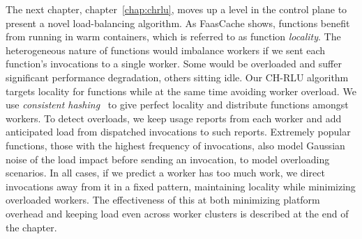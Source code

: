 The next chapter, chapter~\ref{chap:chrlu}, moves up a level in the control plane to present a novel load-balancing algorithm. %
As FaasCache shows, functions benefit from running in warm containers, which is referred to as function \emph{locality}.
The heterogeneous nature of functions would imbalance workers if we sent each function's invocations to a single worker.
Some would be overloaded and suffer significant performance degradation, others sitting idle.
Our CH-RLU algorithm targets locality for functions while at the same time avoiding worker overload.
We use \emph{consistent hashing}~\cite{karger1997consistent} to give perfect locality and distribute functions amongst workers.
To detect overloads, we keep usage reports from each worker and add anticipated load from dispatched invocations to such reports.
Extremely popular functions, those with the highest frequency of invocations, also model Gaussian noise of the load impact before sending an invocation, to model overloading scenarios.
In all cases, if we predict a worker has too much work, we direct invocations away from it in a fixed pattern, maintaining locality while minimizing overloaded workers.
The effectiveness of this at both minimizing platform overhead and keeping load even across worker clusters is described at the end of the chapter.

